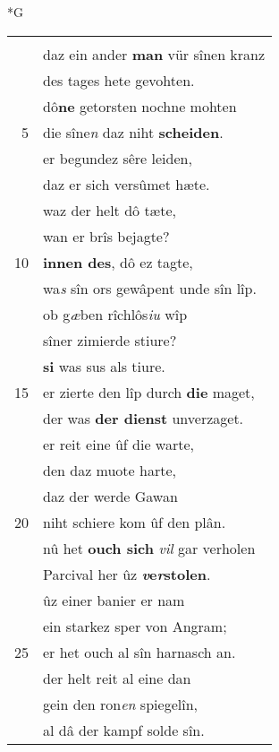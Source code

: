 \documentclass[8pt,a4paper,notitlepage]{article}
\begin{document}
\newpage
\begin{table}[ht]
\begin{minipage}[t]{0.5\linewidth}
\small
\begin{center}*G
\end{center}
\begin{tabular}{rl}
 & \textbf{\begin{large}D\end{large}och} rou den künic Gramoflanz,\\ 
 & daz ein ander \textbf{man} vür sînen kranz\\ 
 & des tages hete gevohten.\\ 
 & dô\textbf{ne} getorsten nochne mohten\\ 
5 & die sîne\textit{n} daz niht \textbf{scheiden}.\\ 
 & er begundez sêre leiden,\\ 
 & daz er sich versûmet hæte.\\ 
 & waz der helt dô tæte,\\ 
 & wan er brîs bejagte?\\ 
10 & \textbf{innen des}, dô ez tagte,\\ 
 & wa\textit{s} sîn ors gewâpent unde sîn lîp.\\ 
 & ob g\textit{æ}ben rîchlôs\textit{iu} wîp\\ 
 & sîner zimierde stiure?\\ 
 & \textbf{si} was sus als tiure.\\ 
15 & er zierte den lîp durch \textbf{die} maget,\\ 
 & der was \textbf{der dienst} unverzaget.\\ 
 & er reit eine ûf die warte,\\ 
 & den daz muote harte,\\ 
 & daz der werde Gawan\\ 
20 & niht schiere kom ûf den plân.\\ 
 & nû het \textbf{ouch sich} \textit{vil} gar verholen\\ 
 & Parcival her ûz \textbf{\textit{v}e\textit{r}stolen}.\\ 
 & ûz einer banier er nam\\ 
 & ein starkez sper von Angram;\\ 
25 & er het ouch al sîn harnasch an.\\ 
 & der helt reit al eine dan\\ 
 & gein den ron\textit{en} spiegelîn,\\ 
 & al dâ der kampf solde sîn.\\ 

\end{tabular}
\end{minipage}
\end{table}
\end{document}
